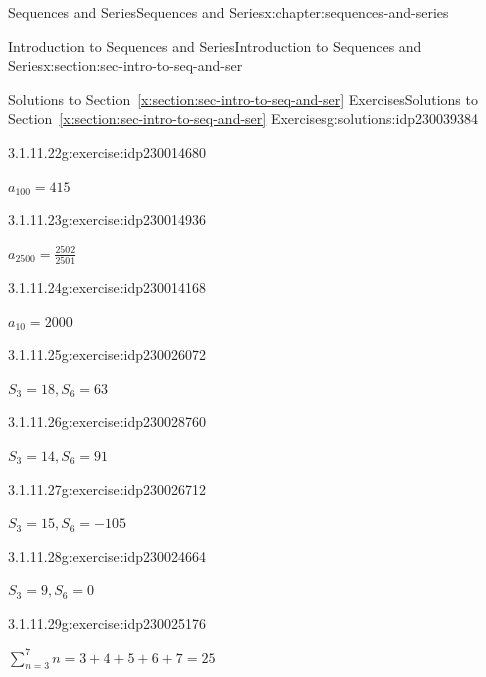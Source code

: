 \documentclass[twoside,10pt,]{book}
\newcommand{\xreffont}{\relax}
\numberwithin{equation}{section}
\begin{document}
\begin{chapterptx}{Sequences and Series}{}{Sequences and Series}{}{}{x:chapter:sequences-and-series}
\begin{sectionptx}{Introduction to Sequences and Series}{}{Introduction to Sequences and Series}{}{}{x:section:sec-intro-to-seq-and-ser}
\begin{solutions-subsection}{Solutions to Section~{\xreffont\ref*{x:section:sec-intro-to-seq-and-ser}} Exercises}{}{Solutions to Section~{\xreffont\ref*{x:section:sec-intro-to-seq-and-ser}} Exercises}{}{}{g:solutions:idp230039384}
\begin{exercisegroup}
\begin{divisionsolutioneg}{3.1.11.22}{}{g:exercise:idp230014680}
\par\smallskip%
\noindent\hypertarget{g:solution:idp230014296-main}{}\(a_{100} = 415\)\end{divisionsolutioneg}%
\begin{divisionsolutioneg}{3.1.11.23}{}{g:exercise:idp230014936}%
\par\smallskip%
\noindent\hypertarget{g:solution:idp230013272-main}{}\(a_{2500} = \frac{2502}{2501}\)\end{divisionsolutioneg}%
\begin{divisionsolutioneg}{3.1.11.24}{}{g:exercise:idp230014168}%
\par\smallskip%
\noindent\hypertarget{g:solution:idp230013784-main}{}\(a_{10} = 2000\)\end{divisionsolutioneg}%
\end{exercisegroup}
\par\medskip\noindent
\begin{exercisegroup}
\begin{divisionsolutioneg}{3.1.11.25}{}{g:exercise:idp230026072}%
\par\smallskip%
\noindent\hypertarget{g:solution:idp230025944-main}{}\(S_3 = 18, S_6 = 63\)\end{divisionsolutioneg}%
\begin{divisionsolutioneg}{3.1.11.26}{}{g:exercise:idp230028760}%
\par\smallskip%
\noindent\hypertarget{g:solution:idp230024920-main}{}\(S_3 = 14, S_6 = 91\)\end{divisionsolutioneg}%
\begin{divisionsolutioneg}{3.1.11.27}{}{g:exercise:idp230026712}%
\par\smallskip%
\noindent\hypertarget{g:solution:idp230029400-main}{}\(S_3 = 15, S_6 = -105\)\end{divisionsolutioneg}%
\begin{divisionsolutioneg}{3.1.11.28}{}{g:exercise:idp230024664}%
\par\smallskip%
\noindent\hypertarget{g:solution:idp230023640-main}{}\(S_3 = 9, S_6 = 0\)\end{divisionsolutioneg}%
\end{exercisegroup}
\par\medskip\noindent
\begin{exercisegroup}
\begin{divisionsolutioneg}{3.1.11.29}{}{g:exercise:idp230025176}%
\par\smallskip%
\noindent\hypertarget{g:solution:idp230022872-main}{}\(\sum\limits_{n = 3}^7 n  = 3 + 4 + 5 + 6 + 7 = 25\)\end{divisionsolutioneg}%

\end{exercisegroup}
\end{solutions-subsection}
\end{sectionptx}
\end{chapterptx}
\end{document}
